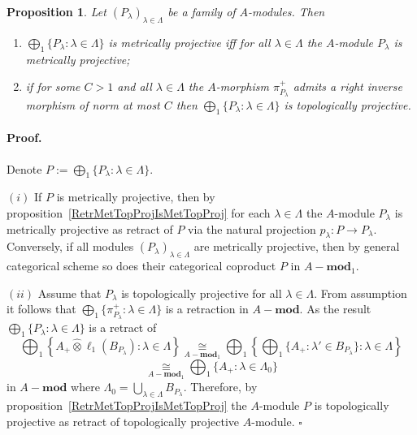 \documentclass[12pt]{article}
\newcommand{\projtens}{\mathbin{\widehat{\otimes}}}
\newcommand{\isom}[1]{\mathop{\mathbin{\cong}}\limits_{#1}}
\newtheorem{proposition}[theorem]{Proposition}
\renewenvironment{proof}{\paragraph{Proof.}}{\hfill$\square$\medskip}
\begin{document}
\begin{proposition}\label{MetTopProjModCoprod} Let
    ${(P_\lambda)}_{\lambda\in\Lambda}$ be a family of $A$-modules. Then
    \begin{enumerate}[label = (\roman*)]
        \item $\bigoplus_1\{P_\lambda:\lambda\in\Lambda \}$ is metrically
              projective iff for all $\lambda\in\Lambda$ the $A$-module
              $P_\lambda$ is metrically projective;

        \item if for some $C>1$ and all $\lambda\in\Lambda$ the $A$-morphism
              $\pi_{P_\lambda}^+$ admits a right inverse morphism of norm at
              most $C$ then $\bigoplus_1\{P_\lambda:\lambda\in\Lambda \}$ is
              topologically projective.
    \end{enumerate}
\end{proposition}
\begin{proof} Denote $P:=\bigoplus_1\{P_\lambda:\lambda\in\Lambda \}$.

    $(i)$ If $P$ is metrically projective, then by
    proposition~\ref{RetrMetTopProjIsMetTopProj} for each $\lambda\in\Lambda$
    the $A$-module $P_\lambda$ is metrically projective as retract of $P$ via
    the natural projection $p_\lambda:P\to P_\lambda$. Conversely, if all
    modules ${(P_\lambda)}_{\lambda\in\Lambda}$ are metrically projective, then
    by general categorical scheme so does their categorical coproduct $P$ in
    $A-\mathbf{mod}_1$.

    $(ii)$ Assume that $P_\lambda$ is topologically projective for all
    $\lambda\in\Lambda$. From assumption it follows that
    $\bigoplus_1\{\pi_{P_\lambda}^+:\lambda\in\Lambda \}$ is a retraction in
    $A-\mathbf{mod}$. As the result 
    $\bigoplus_1\{P_\lambda:\lambda\in\Lambda \}$ is a retract of
    $$
        \bigoplus\nolimits_1\left \{
        A_+\projtens \ell_1(B_{P_\lambda}):\lambda\in\Lambda
        \right \}
        \isom{A-\mathbf{mod}_1}
        \bigoplus\nolimits_1\left \{
        \bigoplus\nolimits_1\{A_+:\lambda'\in B_{P_\lambda}\}:
        \lambda\in\Lambda
        \right \}
    $$
    $$
        \isom{A-\mathbf{mod}_1}
        \bigoplus\nolimits_1\{A_+:\lambda\in\Lambda_0\}
    $$
    in $A-\mathbf{mod}$ where 
    $\Lambda_0=\bigcup_{\lambda\in\Lambda}B_{P_\lambda}$.
    Therefore, by proposition~\ref{RetrMetTopProjIsMetTopProj} the $A$-module
    $P$ is topologically projective as retract of  topologically projective
    $A$-module.
\end{proof}
\end{document}
